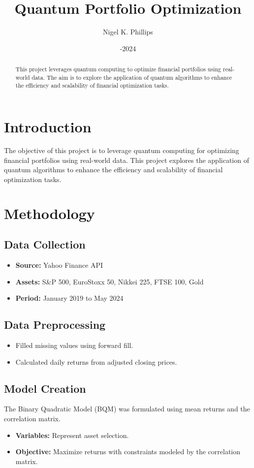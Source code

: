 \documentclass{article}
\title{Quantum Portfolio Optimization}
\author{Nigel K. Phillips}
\date{\July-24-2024}
\begin{document}
\maketitle

\begin{abstract}
This project leverages quantum computing to optimize financial portfolios using real-world data. The aim is to explore the application of quantum algorithms to enhance the efficiency and scalability of financial optimization tasks.
\end{abstract}

\section{Introduction}
The objective of this project is to leverage quantum computing for optimizing financial portfolios using real-world data. This project explores the application of quantum algorithms to enhance the efficiency and scalability of financial optimization tasks.

\section{Methodology}
\subsection{Data Collection}
\begin{itemize}
    \item \textbf{Source:} Yahoo Finance API
    \item \textbf{Assets:} S\&P 500, EuroStoxx 50, Nikkei 225, FTSE 100, Gold
    \item \textbf{Period:} January 2019 to May 2024
\end{itemize}

\subsection{Data Preprocessing}
\begin{itemize}
    \item Filled missing values using forward fill.
    \item Calculated daily returns from adjusted closing prices.
\end{itemize}

\subsection{Model Creation}
The Binary Quadratic Model (BQM) was formulated using mean returns and the correlation matrix.
\begin{itemize}
    \item \textbf{Variables:} Represent asset selection.
    \item \textbf{Objective:} Maximize returns with constraints modeled by the correlation matrix.
\end{itemize}
\end{document}
